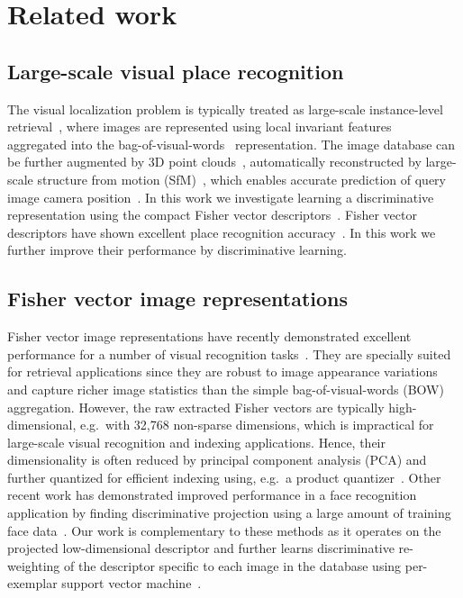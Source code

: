 \documentclass[10pt,twocolumn,letterpaper]{article}
\begin{document}
\section{Related work} 
\label{sec:related}

\subsection*{Large-scale visual place recognition} %
    The visual localization problem is typically treated as large-scale instance-level retrieval~\cite{Cummins09,Chen11,Gronat13,Knopp2010,Schindler07,Torii2013,Zamir10}, where images are represented using local invariant features~\cite{Lowe04} aggregated into the bag-of-visual-words~\cite{Csurka04,Sivic03} representation. The image database can be further augmented by 3D point clouds~\cite{Klinger13}, automatically reconstructed by large-scale structure from motion (SfM)~\cite{Agarwal-ICCV-2009,Klinger13}, which enables accurate prediction of query image camera position~\cite{Li12,Sattler12}. In this work we investigate learning a discriminative representation using the compact Fisher vector descriptors~\cite{Jegou12}. Fisher vector descriptors have shown excellent place recognition accuracy~\cite{Torii2013}. In this work we further improve their performance by discriminative learning.



\subsection*{Fisher vector image representations} %
    Fisher vector image representations have recently demonstrated excellent performance for a number of visual recognition tasks~\cite{Chatfield11,Jegou12,Krapac2011,Simonyan2013}. They are specially suited for retrieval applications since they are robust to image appearance variations and capture richer image statistics than the simple bag-of-visual-words (BOW) aggregation. However, the raw extracted Fisher vectors are typically high-dimensional, e.g.\ with 32,768 non-sparse dimensions, which is impractical for large-scale visual recognition and indexing applications. Hence, their dimensionality is often reduced by principal component analysis (PCA) and further quantized for efficient indexing using, e.g.\, a product quantizer~\cite{Jegou12}.  Other recent work has demonstrated improved performance in a face recognition application by finding discriminative projection using a large amount of training face data~\cite{Simonyan2013}. Our work is complementary to these methods as it operates on the projected low-dimensional descriptor and further learns discriminative re-weighting of the descriptor specific to each image in the database using per-exemplar support vector machine~\cite{Malisiewicz11}.
\end{document}
